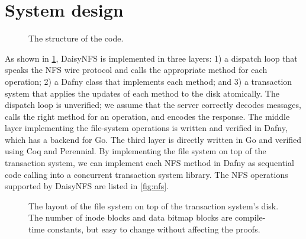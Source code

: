 \section{System design}%
\label{sec:daisy:system}


\begin{figure}
  \center
  
  \caption{The structure of the code.}
  \label{fig:system}
\end{figure}

As shown in \cref{fig:system}, DaisyNFS is implemented in three layers:
1) a dispatch loop that speaks the NFS wire protocol and calls the
appropriate method for each operation; 2) a Dafny class that
implements each method; and 3) a transaction system that applies the
updates of each method to the disk atomically.  The dispatch loop is
unverified; we assume that the server correctly decodes messages,
calls the right method for an operation, and encodes the response. The
middle layer implementing the file-system operations is written
and verified in Dafny, which has a backend for Go.  The
third layer is directly written in Go and verified using Coq and
Perennial.  By implementing the file system on top of the transaction
system, we can implement each NFS method in Dafny as sequential code
calling into a concurrent transaction system library. The NFS
operations supported by DaisyNFS are listed in \cref{fig:nfs}.


\begin{figure}
  \centering
  
  \caption{The layout of the file system on top of the transaction system's
    disk. The number of inode blocks and data bitmap blocks are compile-time
    constants, but easy to change without affecting the proofs.}
  \label{fig:layout}
\end{figure}

